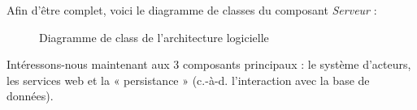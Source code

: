\newpage
Afin d’être complet, voici le diagramme de classes du composant \emph{Serveur} :
\begin{figure}[H]
    \begin{center}

        \caption{Diagramme de class de l'architecture logicielle}
    \end{center}
\end{figure}

Intéressons-nous maintenant aux 3 composants principaux : le système d’acteurs, les services web et la « persistance » (c.-à-d. l’interaction avec la base de données).


